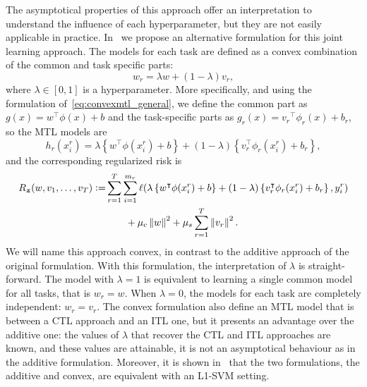 The asymptotical properties of this approach offer an interpretation to understand the influence of each hyperparameter, but they are not easily applicable in practice.
In~\cite{RuizAD19} we propose an alternative formulation for this joint learning approach. The models for each task are defined as a convex combination of the common and task specific parts:
\begin{equation}
    \nonumber
    {w}_r = \lambda {w} + (1 - \lambda) {v}_r,
\end{equation}
where $\lambda \in \left[0, 1\right]$ is a hyperparameter.
More specifically, and using the formulation of~\eqref{eq:convexmtl_general}, we define the common part as $g(x) =  {w}^\intercal {\phi(x)} + b$ and the task-specific parts as $g_r(x) = {v_r}^\intercal {\phi_r(x)} + b_r$, so the MTL models are
\begin{equation}
    \nonumber
    h_r(x_i^r) = \lambda \left\lbrace {w}^\intercal {\phi(x_i^r)} + b \right\rbrace + (1 - \lambda) \left\lbrace {v}_r^\intercal {\phi_r(x_i^r)} + b_r \right\rbrace ,
\end{equation}
and the corresponding regularized risk is 
\begin{equation}
    \nonumber
    \begin{aligned}
        R_{\bm{z}} ({w, v_1, \ldots, v_T}) \vcentcolon= &\sum_{r=1}^{T} \sum_{i=1}^{m_r} \ell(\lambda \left\lbrace {w}^\intercal {\phi(x_i^r)} + b \right\rbrace + (1 - \lambda) \left\lbrace {v}_r^\intercal {\phi_r(x_i^r)} + b_r \right\rbrace, y_i^r) \\ 
        &\qquad + \mu_c \left\lVert{w}\right\rVert^2 + \mu_s \sum_{r=1}^T \left\lVert{v}_r\right\rVert^2 .
    \end{aligned}
\end{equation}
We will name this approach {convex}, in contrast to the {additive} approach of the original formulation.
With this formulation, the interpretation of $\lambda$ is straight-forward. The model with $\lambda = 1$ is equivalent to learning a single common model for all tasks, that is ${w}_r = {w}$. When $\lambda=0$, the models for each task are completely independent: ${w}_r = {v}_r$.
The convex formulation also define an MTL model that is between a CTL approach and an ITL one, but it presents an advantage over the additive one: the values of $\lambda$ that recover the CTL and ITL approaches are known, and these values are attainable, it is not an asymptotical behaviour as in the additive formulation. 
%
Moreover, it is shown in~\cite{RuizAD19} that the two formulations, the {additive} and {convex}, are equivalent with an L1-SVM setting.
%




